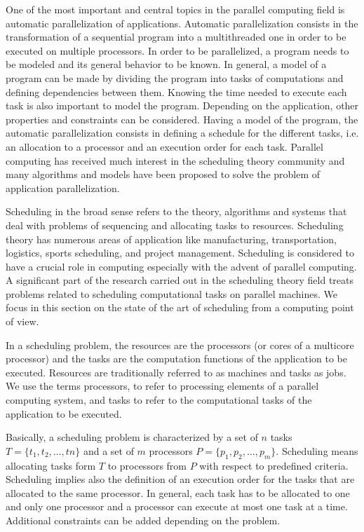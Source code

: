 One of the most important and central topics in the parallel computing field is automatic parallelization of applications. %
Automatic parallelization consists in the transformation of a sequential program into a multithreaded one in order to be executed on multiple processors. In order to be parallelized, a program needs to be modeled and its general behavior to be known. In general, a model of a program can be made by dividing the program into tasks of computations and defining dependencies between them. Knowing the time needed to execute each task is also important to model the program. Depending on the application, other properties and constraints can be considered. Having a model of the program, the automatic parallelization consists in defining a schedule for the different tasks, i.e. an allocation to a processor and an execution order for each task. Parallel computing has received much interest in the scheduling theory community and many algorithms and models have been proposed to solve the problem of application parallelization.   

Scheduling in the broad sense refers to the theory, algorithms and systems that deal with problems of sequencing and allocating tasks to resources. Scheduling theory has numerous areas of application like manufacturing, transportation, logistics, sports scheduling, and project management. Scheduling is considered to have a crucial role in computing especially with the advent of parallel computing. A significant part of the research carried out in the scheduling theory field treats problems related to scheduling computational tasks on parallel machines. We focus in this section on the state of the art of scheduling from a computing point of view.

In a scheduling problem, the resources are the processors (or cores of a multicore processor) and the tasks are the computation functions of the application to be executed. Resources are traditionally referred to as machines and tasks as jobs. We use the terms processors, to refer to processing elements of a parallel computing system, and tasks to refer to the computational tasks of the application to be executed.

Basically, a scheduling problem is characterized by a set of $n$ tasks $T = \{t_1, t_2, \ldots, tn\}$ and a set of $m$ processors $P = \{p_1, p_2, \ldots, p_m\}$. Scheduling means allocating tasks form $T$ to processors from $P$ with respect to predefined criteria. Scheduling implies also the definition of an execution order for the tasks that are allocated to the same processor. In general, each task has to be allocated to one and only one processor and a processor can execute at most one task at a time. Additional constraints can be added depending on the problem. 

